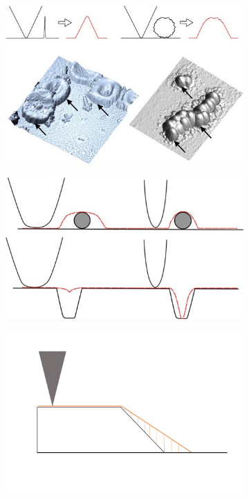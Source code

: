 \begin{figure}[ht]
    \begin{subfigure}[t]{0.3\textwidth}
        \centering
        \caption{\label{fig: AFM Convolution}}
        \includegraphics[width=1\linewidth]{Figures/Convolution artefact 2.jpeg}
    \end{subfigure}
    \hfill
    \begin{subfigure}[t]{0.3\textwidth}
        \centering
        \caption{\label{fig: AFM Convolution 2}}
        \includegraphics[width=1\linewidth]{Figures/AFM convolution artefact.jpg}
    \end{subfigure} 
    \hfill
    \begin{subfigure}[t]{0.3\textwidth}
        \centering
        \caption{\label{fig: AFM Parachuting}}
        \includegraphics[width=1\linewidth]{Figures/AFM parachuting.png}
    \end{subfigure}


\end{figure}
